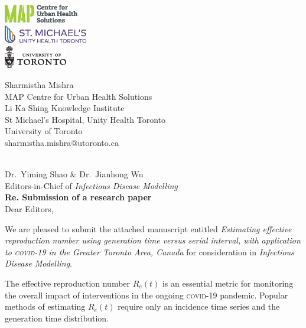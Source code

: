 \documentclass{article}
\newcommand{\covid}{\textsc{covid-19}\xspace}
\begin{document}
\begin{minipage}{0.5\linewidth}
  \includegraphics[height=0.8cm]{map-cuhs.eps}\\[1ex]
  \includegraphics[height=0.8cm]{smh.eps}     \\[1ex]
  \includegraphics[height=1.0cm]{uoft.eps}
\end{minipage}%
\begin{minipage}{0.5\linewidth}
  \begin{flushright}\small
    Sharmistha Mishra\\
    MAP Centre for Urban Health Solutions\\
    Li Ka Shing Knowledge Institute\\
    St Michael's Hospital,
    Unity Health Toronto\\
    University of Toronto\\
    sharmistha.mishra@utoronto.ca
  \end{flushright}
\end{minipage}
\\[3ex]
Dr.\ Yiming Shao \& Dr.\ Jianhong Wu\\
Editors-in-Chief of \textit{Infectious Disease Modelling}\\[2ex]
\textbf{Re. Submission of a research paper}\\[2ex]
Dear Editors,
\par
We are pleased to submit the attached manuscript entitled
\textit{Estimating effective reproduction number using
  generation time versus serial interval, with application to \covid
  in the Greater Toronto Area, Canada}
for consideration in \textit{Infectious Disease Modelling}.
\par
The effective reproduction number $R_e(t)$ is an essential metric
for monitoring the overall impact of interventions
in the ongoing \covid pandemic.
Popular methods of estimating $R_e(t)$ require only
an incidence time series and the generation time distribution.
\end{document}

